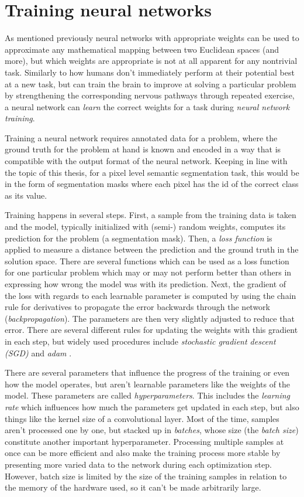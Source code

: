 \section{Training neural networks}
\label{sec:training}

As mentioned previously neural networks with appropriate weights can be used to approximate any mathematical mapping between two Euclidean spaces (and more), but which weights are appropriate is not at all apparent for any nontrivial task. 
Similarly to how humans don't immediately perform at their potential best at a new task, but can train the brain to improve at solving a particular problem by strengthening the corresponding nervous pathways through repeated exercise, a neural network can \emph{learn} the correct weights for a task during \emph{neural network training}.

Training a neural network requires annotated data for a problem, where the ground truth for the problem at hand is known and encoded in a way that is compatible with the output format of the neural network. 
Keeping in line with the topic of this thesis, for a pixel level semantic segmentation task, this would be in the form of segmentation masks where each pixel has the id of the correct class as its value. 

Training happens in several steps. First, a sample from the training data is taken and the model, typically initialized with (semi-) random weights, computes its prediction for the problem (a segmentation mask). Then, a \emph{loss function} is applied to measure a distance between the prediction and the ground truth in the solution space. 
There are several functions which can be used as a loss function for one particular problem which may or may not perform better than others in expressing how wrong the model was with its prediction. 
Next, the gradient of the loss with regards to each learnable parameter is computed by using the chain rule for derivatives to propagate the error backwards through the network (\emph{backpropagation}). 
The parameters are then very slightly adjusted to reduce that error. 
There are several different rules for updating the weights with this gradient in each step, but widely used procedures include \emph{stochastic gradient descent (SGD)} and \emph{adam} \cite{kingmaAdamMethodStochastic2017}. 

There are several parameters that influence the progress of the training or even how the model operates, but aren't learnable parameters like the weights of the model. 
These parameters are called \emph{hyperparameters}. This includes the \emph{learning rate} which influences how much the parameters get updated in each step, but also things like the kernel size of a convolutional layer. 
Most of the time, samples aren't processed one by one, but stacked up in \emph{batches}, whose size (the \emph{batch size}) constitute another important hyperparameter. 
Processing multiple samples at once can be more efficient and also make the training process more stable by presenting more varied data to the network during each optimization step. However, batch size is limited by the size of the training samples in relation to the memory of the hardware used, so it can't be made arbitrarily large. 

